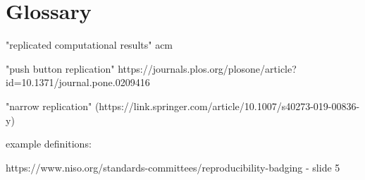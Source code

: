 \section{Glossary}



"replicated computational results" acm

"push button replication" https://journals.plos.org/plosone/article?id=10.1371/journal.pone.0209416

"narrow replication" (https://link.springer.com/article/10.1007/s40273-019-00836-y)




\renewcommand{\glossarysection}[2][]{}
\printglossaries

example definitions:

https://www.niso.org/standards-committees/reproducibility-badging - slide 5